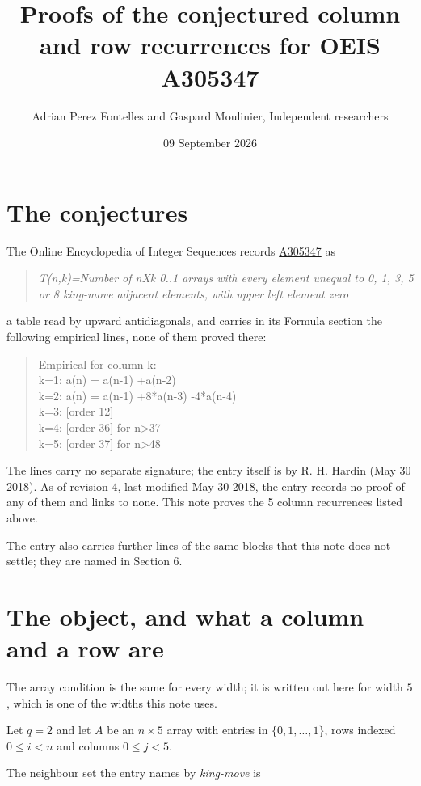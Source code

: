 \documentclass[11pt]{article}
\title{Proofs of the conjectured column and row recurrences for OEIS A305347}
\author{Adrian Perez Fontelles and Gaspard Moulinier, Independent researchers}
\date{09 September 2026}
\theoremstyle{definition}
\begin{document}
\maketitle
\section{The conjectures}

The Online Encyclopedia of Integer Sequences records \href{https://oeis.org/A305347}{A305347} as

\begin{quote}\itshape T(n,k)=Number of nXk 0..1 arrays with every element unequal to 0, 1, 3, 5 or 8 king-move adjacent elements, with upper left element zero\end{quote}

a table read by upward antidiagonals, and carries in its Formula section the following empirical lines, none of them proved there:

\begin{quote}\ttfamily Empirical for column k:\\
k=1: a(n) = a(n-1) +a(n-2)\\k=2: a(n) = a(n-1) +8*a(n-3) -4*a(n-4)\\k=3: [order 12]\\k=4: [order 36] for n>37\\k=5: [order 37] for n>48\end{quote}

The lines carry no separate signature; the entry itself is by R. H. Hardin (May 30 2018). As of revision 4, last modified May 30 2018, the entry records no proof of any of them and links to none. This note proves the 5 column recurrences listed above.

The entry also carries further lines of the same blocks that this note does not settle; they are named in Section 6.

\section{The object, and what a column and a row are}

The array condition is the same for every width; it is written out here for width $5$, which is one of the widths this note uses.

Let $q = 2$ and let $A$ be an $n \times 5$ array with entries in $\{0,1,\dots,1\}$, rows indexed $0 \le i < n$ and columns $0 \le j < 5$.

The neighbour set the entry names by {\itshape king-move} is
\end{document}
